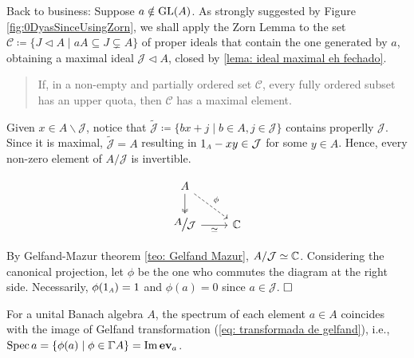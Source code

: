 Back to business: Suppose $a\notin \operatorname{GL}(A)$. As strongly suggested by Figure \ref{fig:0DyasSinceUsingZorn}, we shall apply the Zorn Lemma to the set $\mathscr C \coloneqq \{J \triangleleft A \mid aA \subseteq J \subsetneq A\}$ of proper ideals that contain the one generated by $a$, obtaining a maximal ideal $\mathcal J\triangleleft A$, closed by \ref{lema: ideal maximal eh fechado}.
\begin{quote}
    \begin{invocacao}
    \label{invocacao: lema de zorn}
    If, in a non-empty and partially ordered set $\mathscr C$, every fully ordered subset has an upper quota, then $\mathscr C$ has a maximal element.
    \end{invocacao}
\end{quote}
\begin{minipage}{0.68\linewidth}
Given $x \in A \backslash \mathcal J$, notice that $\widetilde{\mathcal J} \coloneqq \{bx+j \mid b\in A, j \in \mathcal J\}$ contains properlly $\mathcal J$. Since it is maximal, $\widetilde{\mathcal J} = A$ resulting in $\sub 1A - xy \in \mathcal J$ for some $y\in A$. Hence, every non-zero element of $A/\mathcal J$ is invertible. 
\end{minipage}
\begin{minipage}{0.3\linewidth}
\begin{equation*}
\begin{tikzcd}
A \arrow[d, two heads] \arrow[rd, "\phi", dashed] &           \\
\mfrac{A}{\mathcal J} \arrow[r, "\simeq"']                  & \mathbb C
\end{tikzcd}
\end{equation*}
\end{minipage}

By Gelfand-Mazur theorem \ref{teo: Gelfand Mazur}, $A/\mathcal J \simeq \operatorname{\mathbb{C}}$. Considering the canonical projection, let $\phi$ be the one who commutes the diagram at the right side. Necessarily, $\phi(\sub 1A) = 1$ and $\phi(a) = 0$ since $a\in \mathcal J$. $\hfill \square$
\vspace{0.1cm}
\begin{corolario}
\label{corol: Spec = im ev}
For a unital Banach algebra $A$, the spectrum of each element $a\in A$ coincides with the image of Gelfand transformation (\ref{eq: transformada de gelfand}), i.e.,
$\Spec a = \{\phi(a) \mid \phi \in \GGamma A\} = \Im \ev_a$.
\end{corolario}

